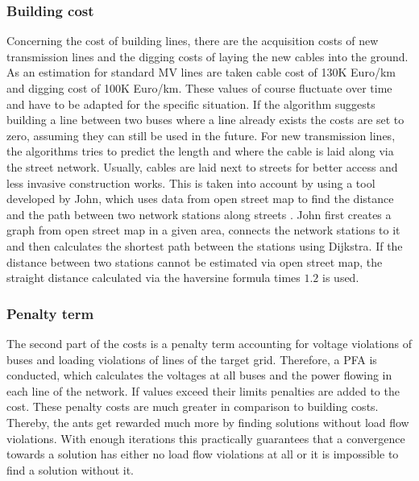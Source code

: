 \subsubsection{Building cost}
Concerning the cost of building lines, there are the acquisition costs of new transmission lines and the digging costs of laying the new cables into the ground. As an estimation for standard MV lines are taken cable cost of 130K Euro/km and digging cost of 100K Euro/km. These values of course fluctuate over time and have to be adapted for the specific situation. If the algorithm suggests building a line between two buses where a line already exists the costs are set to zero, assuming they can still be used in the future. For new transmission lines, the algorithms tries to predict the length and where the cable is laid along via the street network. Usually, cables are laid next to streets for better access and less invasive construction works. This is taken into account by using a tool developed by John, which uses data from open street map to find the distance and the path between two network stations along streets \cite{robert_john}. John first creates a graph from open street map in a given area, connects the network stations to it and then calculates the shortest path between the stations using Dijkstra. If the distance between two stations cannot be estimated via open street map, the straight distance calculated via the haversine formula times $1.2$ is used.

\subsubsection{Penalty term}
The second part of the costs is a penalty term accounting for voltage violations of buses and loading violations of lines of the target grid. Therefore, a PFA is conducted, which calculates the voltages at all buses and the power flowing in each line of the network. If values exceed their limits penalties are added to the cost. These penalty costs are much greater in comparison to building costs. Thereby, the ants get rewarded much more by finding solutions without load flow violations. With enough iterations this practically guarantees that a convergence towards a solution has either no load flow violations at all or it is impossible to find a solution without it.


